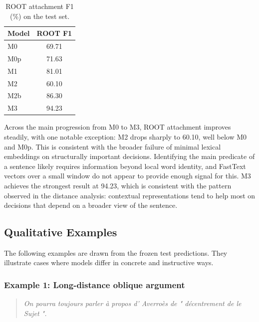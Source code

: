\documentclass[12pt,letterpaper]{article}
\begin{document}
\begin{table}[ht]
\centering
\caption{ROOT attachment F1 (\%) on the test set.}
\label{tab:root_attachment}
\begin{tabular}{lc}
\toprule
\textbf{Model} & \textbf{ROOT F1} \\
\midrule
M0  & 69.71 \\
M0p & 71.63 \\
M1  & 81.01 \\
M2  & 60.10 \\
M2b & 86.30 \\
M3  & 94.23 \\
\bottomrule
\end{tabular}
\end{table}
\FloatBarrier
Across the main progression from M0 to M3, ROOT attachment improves steadily, with one notable exception: M2 drops sharply to 60.10, well below M0 and M0p. This is consistent with the broader failure of minimal lexical embeddings on structurally important decisions. Identifying the main predicate of a sentence likely requires information beyond local word identity, and FastText vectors over a small window do not appear to provide enough signal for this. M3 achieves the strongest result at 94.23, which is consistent with the pattern observed in the distance analysis: contextual representations tend to help most on decisions that depend on a broader view of the sentence.

\subsection{Qualitative Examples}
\label{subsec:qualitative_examples}

The following examples are drawn from the frozen test predictions. They illustrate cases where models differ in concrete and instructive ways.

\subsubsection*{Example 1: Long-distance oblique argument}

\begin{quote}
\textit{On pourra toujours parler à propos d' Averroès de " décentrement de le Sujet ".}
\end{quote}
\end{document}
